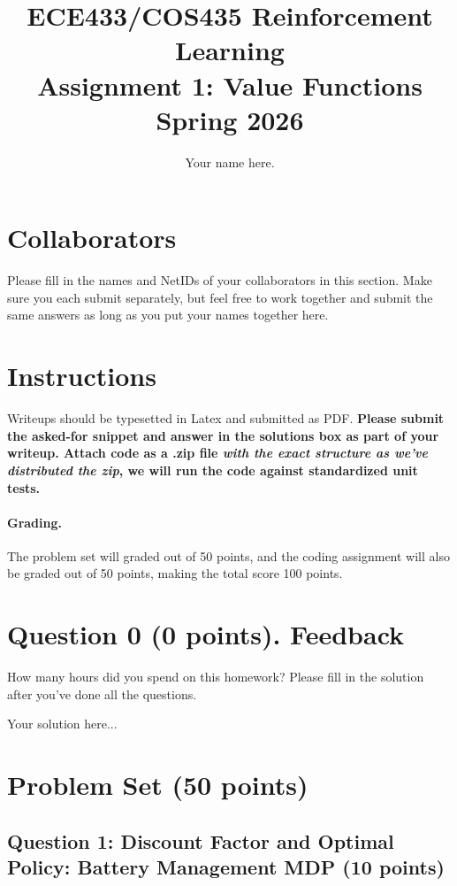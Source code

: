 \documentclass[12pt]{article}
\author{\begin{fillme}[width=0.3\textwidth]
 Your name here.
\end{fillme}} %
\title{ECE433/COS435 Reinforcement Learning\\
      Assignment 1: Value Functions\\
  Spring 2026\\
}
\begin{document}
  \maketitle
  \section*{Collaborators}
\begin{fillme}
 Please fill in the names and NetIDs of your collaborators in this section. Make sure you each submit separately, but feel free to work together and submit the same answers as long as you put your names together here.
\end{fillme}

\section*{Instructions}
Writeups should be typesetted in Latex and submitted as PDF. \textbf{Please submit the asked-for snippet and answer in the solutions box as part of your writeup. Attach code as a .zip file \emph{with the exact structure as we've distributed the zip}, we will run the code against standardized unit tests.}

\paragraph{Grading.} 
The problem set will graded out of 50 points, and the coding assignment will also be graded out of 50 points, making the total score 100 points.

\section*{Question 0 (0 points). Feedback}
How many hours did you spend on this homework? Please fill in the solution after you've done all the questions.
\begin{solution}
    Your solution here...
\end{solution}

\section*{Problem Set (50 points)}

\subsection*{Question 1: Discount Factor and Optimal Policy: Battery Management MDP (10 points)}
\end{document}
